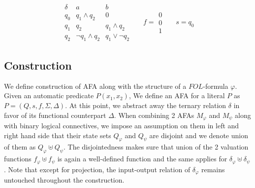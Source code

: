 \begin{example}
\begin{align*}
  \begin{array}{c|cc}
    \delta & a & b \\\hline
    q_0 & q_1 \wedge q_2      & 0              \\
    q_1 & q_2                 & q_1 \wedge q_2 \\
    q_2 & \neg q_1 \wedge q_2 & q_1 \vee \neg q_2
  \end{array}&& f = \begin{smallmatrix}0\\0\\1\end{smallmatrix} && s = q_0
\end{align*}
\end{example}

\subsection{Construction}

We define construction of AFA along with the structure of a \( \mathit{FOL}
\)-formula \( \varphi \). Given an automatic predicate \( P(x_1, x_2) \), We
define an AFA for a literal \( P \) as \( P = (Q, s, f, \Sigma, \Delta) \). At
this point, we abstract away the ternary relation \( \delta \) in favor of its
functional counterpart \( \Delta \). When combining 2 AFAs \( \mathit{M}_\varphi
\) and \( \mathit{M}_\psi \) along with binary logical connectives, we impose an
assumption on them in left and right hand side that their state sets \(
Q_\varphi \) and \( Q_\psi \) are disjoint and we denote union of them as \(
Q_\varphi \uplus Q_\psi \).  The disjointedness makes sure that union of the 2
valuation functions \( f_\varphi \uplus f_\psi \) is again a well-defined
function and the same applies for \( \delta_\varphi \uplus \delta_\psi \). Note
that except for projection, the input-output relation of \( \delta_{\varphi} \)
remains untouched throughout the construction.

\begin{prooftree}
\end{prooftree}

